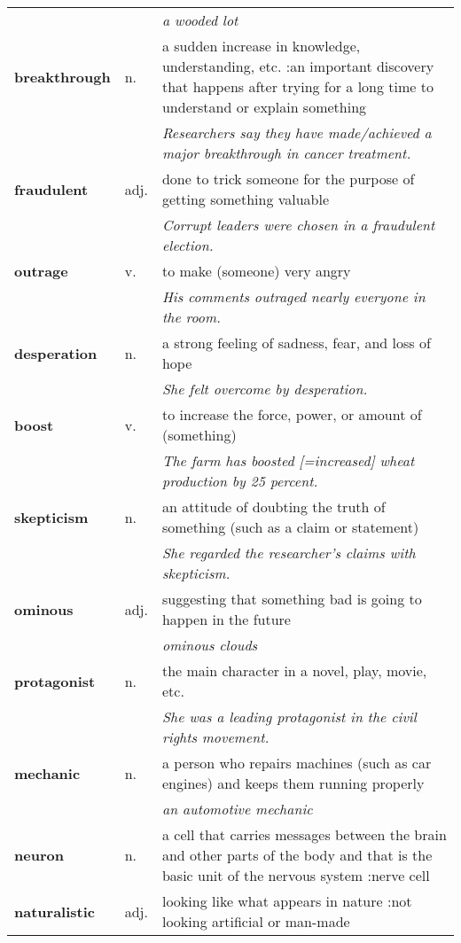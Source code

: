 \documentclass[a4paper]{article}
\begin{document}
\begin{longtable}{llp{11cm}}
 & & \textit{a wooded lot}\\[0.08cm]
\textbf{breakthrough} & n. &  a sudden increase in knowledge, understanding, etc. :an important discovery that happens after trying for a long time to understand or explain something \\
 & & \textit{Researchers say they have made/achieved a major breakthrough in cancer treatment.}\\[0.08cm]
\textbf{fraudulent} & adj. &  done to trick someone for the purpose of getting something valuable \\
 & & \textit{Corrupt leaders were chosen in a fraudulent election.}\\[0.08cm]
\textbf{outrage} & v. &  to make (someone) very angry \\
 & & \textit{His comments outraged nearly everyone in the room.}\\[0.08cm]
\textbf{desperation} & n. &  a strong feeling of sadness, fear, and loss of hope \\
 & & \textit{She felt overcome by desperation.}\\[0.08cm]
\textbf{boost} & v. &  to increase the force, power, or amount of (something) \\
 & & \textit{The farm has boosted [=increased] wheat production by 25 percent.}\\[0.08cm]
\textbf{skepticism} & n. &  an attitude of doubting the truth of something (such as a claim or statement) \\
 & & \textit{She regarded the researcher's claims with skepticism.}\\[0.08cm]
\textbf{ominous} & adj. &  suggesting that something bad is going to happen in the future \\
 & & \textit{ominous clouds}\\[0.08cm]
\textbf{protagonist} & n. &  the main character in a novel, play, movie, etc.\\
 & & \textit{She was a leading protagonist in the civil rights movement.}\\[0.08cm]
\textbf{mechanic} & n. &  a person who repairs machines (such as car engines) and keeps them running properly \\
 & & \textit{an automotive mechanic}\\[0.08cm]
\textbf{neuron} & n. &  a cell that carries messages between the brain and other parts of the body and that is the basic unit of the nervous system :nerve cell\\[0.08cm]
\textbf{naturalistic} & adj. &  looking like what appears in nature :not looking artificial or man-made \\

\end{longtable}
\end{document}
